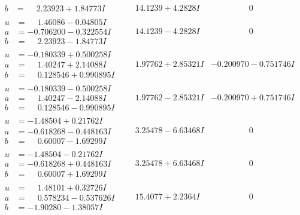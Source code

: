 \documentclass[1p]{elsarticle_modified}
\theoremstyle{definition}
\begin{document}
$$\begin{array}{c|c|c}
\begin{aligned}
b &= \phantom{-}2.23923 + 1.84773 I\end{aligned}
 & \phantom{-}14.1239 + 4.2828 I & \phantom{-0.000000 } 0 \\ \hline\begin{aligned}
u &= \phantom{-}1.46086 - 0.04805 I \\
a &= -0.706200 - 0.322554 I \\
b &= \phantom{-}2.23923 - 1.84773 I\end{aligned}
 & \phantom{-}14.1239 - 4.2828 I & \phantom{-0.000000 } 0 \\ \hline\begin{aligned}
u &= -0.180339 + 0.500258 I \\
a &= \phantom{-}1.40247 + 2.14088 I \\
b &= \phantom{-}0.128546 + 0.990895 I\end{aligned}
 & \phantom{-}1.97762 + 2.85321 I & -0.200970 - 0.751746 I \\ \hline\begin{aligned}
u &= -0.180339 - 0.500258 I \\
a &= \phantom{-}1.40247 - 2.14088 I \\
b &= \phantom{-}0.128546 - 0.990895 I\end{aligned}
 & \phantom{-}1.97762 - 2.85321 I & -0.200970 + 0.751746 I \\ \hline\begin{aligned}
u &= -1.48504 + 0.21762 I \\
a &= -0.618268 - 0.448163 I \\
b &= \phantom{-}0.60007 - 1.69299 I\end{aligned}
 & \phantom{-}3.25478 - 6.63468 I & \phantom{-0.000000 } 0 \\ \hline\begin{aligned}
u &= -1.48504 - 0.21762 I \\
a &= -0.618268 + 0.448163 I \\
b &= \phantom{-}0.60007 + 1.69299 I\end{aligned}
 & \phantom{-}3.25478 + 6.63468 I & \phantom{-0.000000 } 0 \\ \hline\begin{aligned}
u &= \phantom{-}1.48101 + 0.32726 I \\
a &= \phantom{-}0.578234 - 0.537626 I \\
b &= -1.90280 - 1.38057 I\end{aligned}
 & \phantom{-}15.4077 + 2.2364 I & \phantom{-0.000000 } 0 \\ \hline\begin{aligned}

\end{aligned}
\end{array}$$
\end{document}
